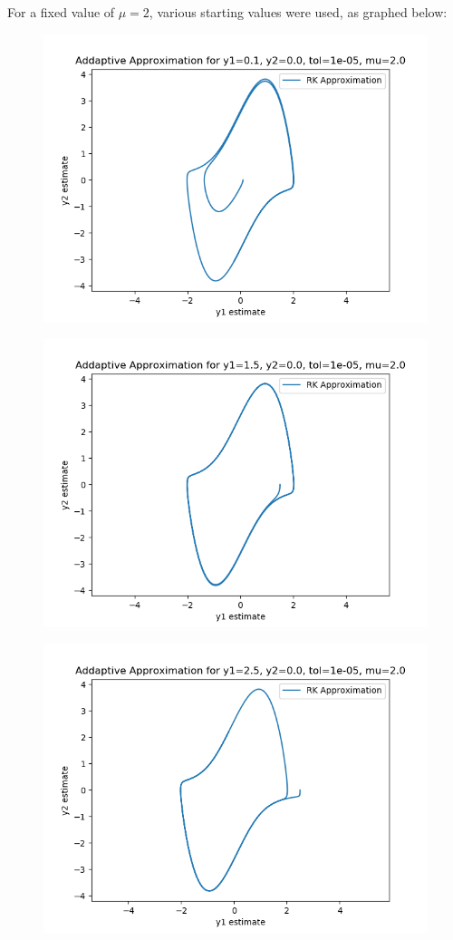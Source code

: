\documentclass{article}
\begin{document}
\begin{itemize}
		For a fixed value of $\mu=2$, various starting values were used,
		as graphed below:
		\begin{figure}[H]
			\includegraphics[scale=0.6]{start_2_01_0}
		\end{figure}
		\begin{figure}[H]
			\includegraphics[scale=0.6]{start_2_15_0}
		\end{figure}
		\begin{figure}[H]
			\includegraphics[scale=0.6]{start_2_25_0}

\end{figure}
\end{itemize}
\end{document}
